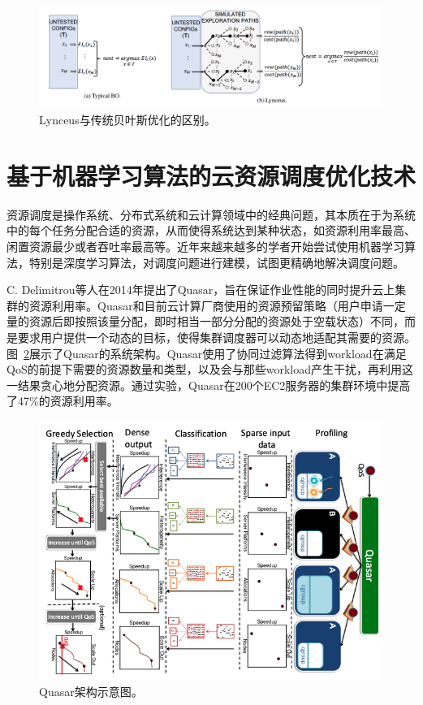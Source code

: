 \begin{figure}[h]
    \centerline{\includegraphics[width=\textwidth]{figures/lynceus-arch.png}}
    \caption{Lynceus与传统贝叶斯优化的区别。}
    \label{lynceus_arch}
\end{figure}

\section{基于机器学习算法的云资源调度优化技术}
资源调度是操作系统、分布式系统和云计算领域中的经典问题，其本质在于为系统中的每个任务分配合适的资源，从而使得系统达到某种状态，如资源利用率最高、闲置资源最少或者吞吐率最高等。近年来越来越多的学者开始尝试使用机器学习算法，特别是深度学习算法，对调度问题进行建模，试图更精确地解决调度问题。

C. Delimitrou等人在2014年提出了Quasar\parencite{delimitrou2014quasar}，旨在保证作业性能的同时提升云上集群的资源利用率。Quasar和目前云计算厂商使用的资源预留策略（用户申请一定量的资源后即按照该量分配，即时相当一部分分配的资源处于空载状态）不同，而是要求用户提供一个动态的目标，使得集群调度器可以动态地适配其需要的资源。图~\ref{quasar_arch}展示了Quasar的系统架构。Quasar使用了协同过滤算法得到workload在满足QoS的前提下需要的资源数量和类型，以及会与那些workload产生干扰，再利用这一结果贪心地分配资源。通过实验，Quasar在200个EC2服务器的集群环境中提高了47\%的资源利用率。

\begin{figure}[h]
    \centerline{\includegraphics[width=\textwidth]{figures/quasar架构.png}}
    \caption{Quasar架构示意图。}
    \label{quasar_arch}
\end{figure}

